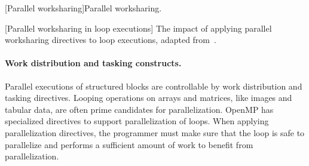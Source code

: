 \begin{center}
\begin{minipage}{\textwidth}
\begin{center}
\begin{minipage}{.45\textwidth}
\end{minipage}\hfill%
\begin{minipage}{.45\textwidth}
\hfill{}
\end{minipage}
[Parallel worksharing]{Parallel worksharing.}
\label{lst:parallel-for}
\end{center}

[Parallel worksharing in loop executions]
{The impact of applying parallel worksharing directives to loop executions, adapted from~\textcite{oak-slides}.}
\label{fig:parallel-for}
\end{minipage}
\end{center}

\paragraph*{Work distribution and tasking constructs.}
Parallel executions of structured blocks are controllable by work distribution and tasking directives.
Looping operations on arrays and matrices, like images and tabular data, are often prime candidates for parallelization.
OpenMP has specialized directives to support parallelization of loops.
When applying parallelization directives, the programmer must make sure that the loop is safe to parallelize and performs a sufficient amount of work to benefit from parallelization.

